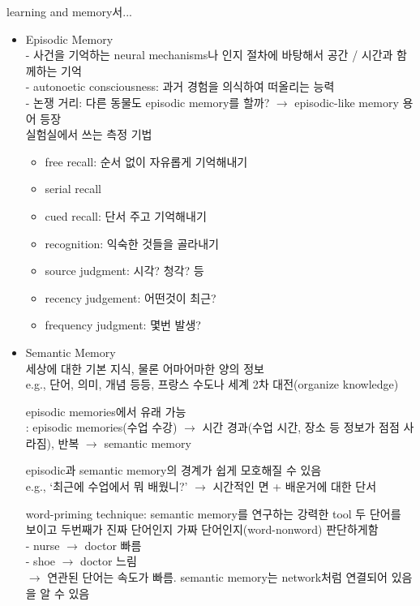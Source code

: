 \documentclass[../note.tex]{subfiles}
\begin{document}
\begin{note}
  learning and memory서...\\
  \begin{itemize}
    \item Episodic Memory\\
      - 사건을 기억하는 neural mechanisms나 인지 절차에 바탕해서 공간 / 시간과 함께하는 기억\\
      - autonoetic consciousness: 과거 경험을 의식하여 떠올리는 능력\\
      - 논쟁 거리: 다른 동물도 episodic memory를 할까? $\rightarrow$ episodic-like memory 용어 등장\\

      실험실에서 쓰는 측정 기법
      \begin{itemize}
        \item free recall: 순서 없이 자유롭게 기억해내기
        \item serial recall
        \item cued recall: 단서 주고 기억해내기
        \item recognition: 익숙한 것들을 골라내기
        \item source judgment: 시각? 청각? 등
        \item recency judgement: 어떤것이 최근?
        \item frequency judgment: 몇번 발생?
      \end{itemize}

    \item Semantic Memory\\
      세상에 대한 기본 지식, 물론 어마어마한 양의 정보\\
      e.g., 단어, 의미, 개념 등등, 프랑스 수도나 세계 2차 대전(organize knowledge)

      episodic memories에서 유래 가능\\
      : episodic memories(수업 수강) $\rightarrow$ 시간 경과(수업 시간, 장소 등 정보가 점점 사라짐), 반복 $\rightarrow$ semantic memory

      episodic과 semantic memory의 경계가 쉽게 모호해질 수 있음\\
      e.g., `최근에 수업에서 뭐 배웠니?' $\rightarrow$ 시간적인 면 + 배운거에 대한 단서

      word-priming technique: semantic memory를 연구하는 강력한 tool
        두 단어를 보이고 두번째가 진짜 단어인지 가짜 단어인지(word-nonword) 판단하게함\\
        - nurse $\rightarrow$ doctor 빠름\\
        - shoe $\rightarrow$ doctor 느림\\
        $\rightarrow$ 연관된 단어는 속도가 빠름. semantic memory는 network처럼 연결되어 있음을 알 수 있음
  \end{itemize}
\end{note}
\end{document}
